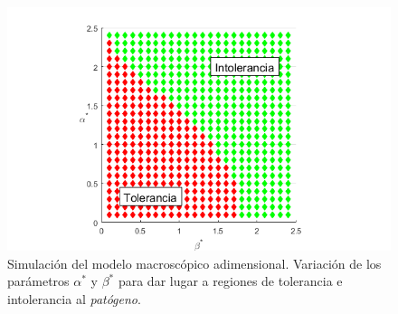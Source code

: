 \begin{figure}[t]
	\centering
	\includegraphics[width=1\textwidth]{Imagenes/Simulaciones/macro_toler_intoler}
	\caption{Simulación del modelo macroscópico adimensional. Variación de los parámetros $\alpha^{*}$ y $\beta^{*}$ para dar lugar a regiones de tolerancia e intolerancia al \textit{patógeno}.}
	\label{fig:macro_toler_intoler}
\end{figure}